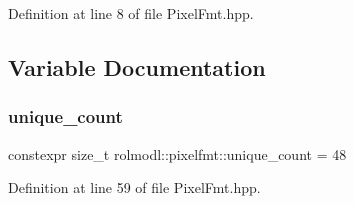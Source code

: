Definition at line 8 of file Pixel\+Fmt.\+hpp.



\subsection{Variable Documentation}
\mbox{\label{namespacerolmodl_1_1pixelfmt_af105fb2cc0e76161c52595a6304abe3f}} 
\subsubsection{\texorpdfstring{unique\_count}{unique\_count}}
{\footnotesize\ttfamily constexpr size\+\_\+t rolmodl\+::pixelfmt\+::unique\+\_\+count = 48}



Definition at line 59 of file Pixel\+Fmt.\+hpp.


